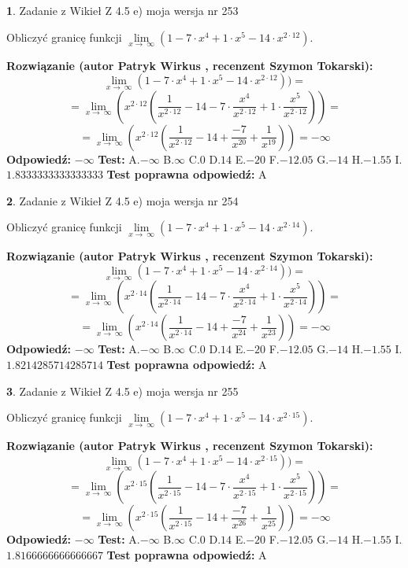 \documentclass[12pt, a4paper]{article}
\theoremstyle{definition} %
\newtheorem{zad}{}
\newcommand{\zadStart}[1]{\begin{zad}#1\newline}
\newcommand{\zadStop}{\end{zad}}
\newcommand{\rozwStart}[2]{\noindent \textbf{Rozwiązanie (autor #1 , recenzent #2): }\newline}
\newcommand{\rozwStop}{\newline}
\newcommand{\odpStart}{\noindent \textbf{Odpowiedź:}\newline}
\newcommand{\odpStop}{\newline}
\newcommand{\testStart}{\noindent \textbf{Test:}\newline}
\newcommand{\testStop}{\newline}
\newcommand{\kluczStart}{\noindent \textbf{Test poprawna odpowiedź:}\newline}
\newcommand{\kluczStop}{\newline}
\begin{document}
\zadStart{Zadanie z Wikieł Z 4.5 e) moja wersja nr 253}


Obliczyć granicę funkcji  $\lim\limits_{x\to\ \infty}(1 - 7 \cdot x^{4}+1 \cdot x^{5}- 14 \cdot x^{2\cdot12})$.
\zadStop
\rozwStart{Patryk Wirkus}{Szymon Tokarski}
$$\lim\limits_{x\to\ \infty}(1 - 7 \cdot x^{4}+1 \cdot x^{5}- 14 \cdot x^{2\cdot12}))=$$
$$=\lim\limits_{x\to\ \infty}(x^{2\cdot12}(\frac{1}{x^{2\cdot12}}-14 -7 \cdot \frac{x^{4}}{x^{2\cdot12}}+1 \cdot \frac{x^{5}}{x^{2\cdot12}}))=$$
$$=\lim\limits_{x\to\ \infty}(x^{2\cdot12}(\frac{1}{x^{2\cdot12}}-14 + \frac{-7}{x^{20}}+ \frac{1}{x^{19}}))=-\infty$$
\rozwStop
\odpStart
$-\infty$
\odpStop
\testStart
A.$-\infty$ B.$\infty$ C.$0$ D.$14$ E.$-20$
F.$-12.05$ G.$-14$
H.$-1.55$
I.$1.8333333333333333$
\testStop
\kluczStart
A
\kluczStop



\zadStart{Zadanie z Wikieł Z 4.5 e) moja wersja nr 254}


Obliczyć granicę funkcji  $\lim\limits_{x\to\ \infty}(1 - 7 \cdot x^{4}+1 \cdot x^{5}- 14 \cdot x^{2\cdot14})$.
\zadStop
\rozwStart{Patryk Wirkus}{Szymon Tokarski}
$$\lim\limits_{x\to\ \infty}(1 - 7 \cdot x^{4}+1 \cdot x^{5}- 14 \cdot x^{2\cdot14}))=$$
$$=\lim\limits_{x\to\ \infty}(x^{2\cdot14}(\frac{1}{x^{2\cdot14}}-14 -7 \cdot \frac{x^{4}}{x^{2\cdot14}}+1 \cdot \frac{x^{5}}{x^{2\cdot14}}))=$$
$$=\lim\limits_{x\to\ \infty}(x^{2\cdot14}(\frac{1}{x^{2\cdot14}}-14 + \frac{-7}{x^{24}}+ \frac{1}{x^{23}}))=-\infty$$
\rozwStop
\odpStart
$-\infty$
\odpStop
\testStart
A.$-\infty$ B.$\infty$ C.$0$ D.$14$ E.$-20$
F.$-12.05$ G.$-14$
H.$-1.55$
I.$1.8214285714285714$
\testStop
\kluczStart
A
\kluczStop



\zadStart{Zadanie z Wikieł Z 4.5 e) moja wersja nr 255}


Obliczyć granicę funkcji  $\lim\limits_{x\to\ \infty}(1 - 7 \cdot x^{4}+1 \cdot x^{5}- 14 \cdot x^{2\cdot15})$.
\zadStop
\rozwStart{Patryk Wirkus}{Szymon Tokarski}
$$\lim\limits_{x\to\ \infty}(1 - 7 \cdot x^{4}+1 \cdot x^{5}- 14 \cdot x^{2\cdot15}))=$$
$$=\lim\limits_{x\to\ \infty}(x^{2\cdot15}(\frac{1}{x^{2\cdot15}}-14 -7 \cdot \frac{x^{4}}{x^{2\cdot15}}+1 \cdot \frac{x^{5}}{x^{2\cdot15}}))=$$
$$=\lim\limits_{x\to\ \infty}(x^{2\cdot15}(\frac{1}{x^{2\cdot15}}-14 + \frac{-7}{x^{26}}+ \frac{1}{x^{25}}))=-\infty$$
\rozwStop
\odpStart
$-\infty$
\odpStop
\testStart
A.$-\infty$ B.$\infty$ C.$0$ D.$14$ E.$-20$
F.$-12.05$ G.$-14$
H.$-1.55$
I.$1.8166666666666667$
\testStop
\kluczStart
A
\kluczStop
\end{document}
